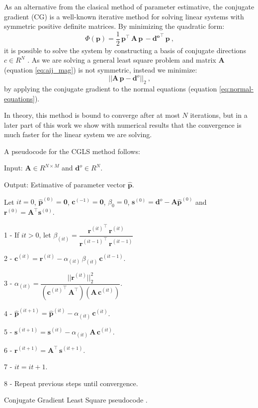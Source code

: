 As an alternative from the clasical method of parameter estimative, the conjugate gradient (CG) is a well-known iterative method for solving linear systems with symmetric positive definite matrices. By minimizing the quadratic form:
\begin{equation}
\, \Phi(\mathbf{p}) = \frac{1}{2} \, \mathbf{p}^{\top} \, \mathbf{A} \, \mathbf{p} \,
- \mathbf{{d}^{o}}^{\top} \, \mathbf{p}\: ,
\label{eq:estimated-p-cg}
\end{equation}
it is possible to solve the system by constructing a basis of conjugate directions $c \in R^N$ \citep{aster2018parameter}. As we are solving a general least square problem and matrix $\mathbf{A}$ (equation \ref{eq:aij_mag}) is not symmetric, instead we minimize:
\begin{equation}
\, || \mathbf{A} \, \mathbf{p} - \mathbf{d}^o||_2 \: ,
\label{eq:estimated-p-cgls}
\end{equation}
by applying the conjugate gradient to the normal equations (equation \ref{eq:normal-equations}).

In theory, this method is bound to converge after at most  $N$ iterations, but in a later part of this work we show with numerical results that the convergence is much faster for the linear system we are solving.

A pseudocode for the CGLS method follows:

\begin{algorithm}[H]
	Input: $\mathbf{A} \in R^{N \times M} $ and $\mathbf{d}^o \in R^N$.
	
	Output: Estimative of parameter vector $\hat{\mathbf{p}}$.
	
	Let $it = 0$, $\hat{\mathbf{p}}^{(0)} = {\mathbf{0}}$, $\mathbf{c}^{(-1)} = {\mathbf{0}}$, $\beta_0 = 0$, $\mathbf{s}^{(0)} = \mathbf{d}^{o} - \mathbf{A} \hat{\mathbf{p}}^{(0)}$ and $\mathbf{r}^{(0)} = \mathbf{A}^{\top} \mathbf{s}^{(0)}$.
	
	1 - If $it > 0$, let $\beta_{(it)} = \dfrac{{\mathbf{r}^{(it)}}^{\top} \, \mathbf{r}^{(it)}} {{\mathbf{r}^{(it - 1)}}^{\top} \, \mathbf{r}^{(it - 1)}}$
	
	2 - $\mathbf{c}^{(it)} = \mathbf{r}^{(it)} - \alpha_{(it)} \,\beta_{(it)} \, \mathbf{c}^{(it - 1)}$.
	
	3 - $\alpha_{(it)} = \dfrac{{||\mathbf{r}^{(it)}||^2_2}}{({\mathbf{c}^{(it)}}^{\top} \, \mathbf{A}^{\top})(\mathbf{A} \, \mathbf{c}^{(it)})}$.
	
	4 - $\hat{\mathbf{p}}^{(it + 1)} = \hat{\mathbf{p}}^{(it)} - \alpha_{(it)} \, \mathbf{c}^{(it)}$.
	
	5 - $\mathbf{s}^{(it + 1)} = \mathbf{s}^{(it)} - \alpha_{(it)} \, \mathbf{A} \, \mathbf{c}^{(it)}$.
	
	6 - $\mathbf{r}^{(it + 1)} = \mathbf{A}^{\top} \, \mathbf{s}^{(it + 1)}$.
	
	7 - $it = it + 1$.
	
	8 - Repeat previous steps until convergence.
	
	\caption{Conjugate Gradient Least Square pseudocode \citep[][ p. 155]{aster2018parameter}.}
\label{al:cgls-algorithm}
\end{algorithm}

